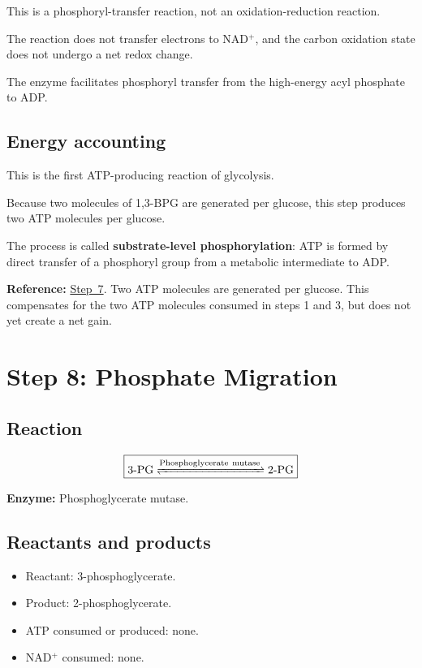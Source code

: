 \documentclass[11pt,a4paper]{article}
\newcommand{\stepref}[1]{\hyperref[step:#1]{Step~#1}}
\newcommand{\Enz}[1]{\textbf{Enzyme:} #1}
\newcommand{\Note}[1]{\par\smallskip
  \noindent\colorbox{gray!12}{
    \parbox{0.96\linewidth}{#1}
  }\par\smallskip}
\begin{document}
This is a phosphoryl-transfer reaction, not an oxidation-reduction
reaction.

The reaction does not transfer electrons to NAD$^+$, and the
carbon oxidation state does not undergo a net redox change.

The enzyme facilitates phosphoryl transfer from the high-energy
acyl phosphate to ADP.

\subsection{Energy accounting}

This is the first ATP-producing reaction of glycolysis.

Because two molecules of 1,3-BPG are generated per glucose,
this step produces two ATP molecules per glucose.

The process is called \textbf{substrate-level phosphorylation}:
ATP is formed by direct transfer of a phosphoryl group from a
metabolic intermediate to ADP.

\Note{
\textbf{Reference:} \stepref{7}. Two ATP molecules are generated
per glucose. This compensates for the two ATP molecules consumed
in steps 1 and 3, but does not yet create a net gain.
}

\section{Step 8: Phosphate Migration}
\label{step:8}

\subsection{Reaction}

\[
\boxed{
\ce{
3-PG <=>[Phosphoglycerate\ mutase] 2-PG
}
}
\]

\Enz{Phosphoglycerate mutase.}

\subsection{Reactants and products}

\begin{itemize}
  \item Reactant: 3-phosphoglycerate.
  \item Product: 2-phosphoglycerate.
  \item ATP consumed or produced: none.
  \item NAD$^+$ consumed: none.
\end{itemize}
\end{document}
